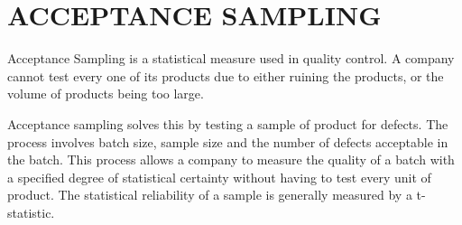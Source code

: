 \documentclass[]{article}
\title{}
\author{}
\begin{document}
\section{ACCEPTANCE SAMPLING}

Acceptance Sampling is a statistical measure used in quality control. A company cannot test every one of its products due to either ruining the products, or the volume of products being too large.

Acceptance sampling solves this by testing a sample of product for defects. The process involves batch size, sample size and the number of defects acceptable in the batch. This process allows a company to measure the quality of a batch with a specified degree of statistical certainty without having to test every unit of product. The statistical reliability of a sample is generally measured by a t-statistic.
\end{document}

